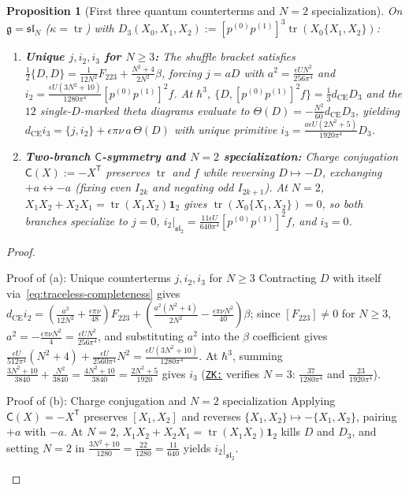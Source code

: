 \documentclass[11pt,letterpaper]{article}
\numberwithin{equation}{section}
\theoremstyle{plain}
\newtheorem{proposition}[theorem]{Proposition}
\theoremstyle{definition}
\theoremstyle{remark}
\newcommand{\fg}{\mathfrak{g}}
\newcommand{\fsl}{\mathfrak{sl}}
\newcommand{\tr}{\operatorname{tr}}
\newcommand{\zkcard}[1]{\href{http://127.0.0.1:9124/?stack=#1}{\texttt{ZK:\detokenize{#1}}}}
\begin{document}
\begin{proposition}[First three quantum counterterms and $N=2$ specialization]
\label{prop:i1-i2-i3}
On $\fg = \fsl_N$ ($\kappa = \tr$) with $D_3(X_0,X_1,X_2) := [p^{(0)}p^{(1)}]^3\tr(X_0\{X_1,X_2\})$:
\begin{enumerate}[label=(\alph*),leftmargin=*]
  \item \textbf{Unique $j, i_2, i_3$ for $N \ge 3$:} The shuffle bracket satisfies $\frac{1}{2}\{D, D\} = \frac{1}{12N^2}F_{223} + \frac{N^2+4}{2N^2}\beta$, forcing $j = a D$ with $a^2 = \frac{\epsilon U N^2}{256\pi^4}$ and $i_2 = \frac{\epsilon U(3N^2+10)}{1280\pi^4}[p^{(0)}p^{(1)}]^2 f$. At $\hbar^3$, $\{D, [p^{(0)}p^{(1)}]^2 f\} = \frac{1}{3}d_{\mathrm{CE}}D_3$ and the $12$ single-$D$-marked theta diagrams evaluate to $\Theta(D) = -\frac{N^2}{60}d_{\mathrm{CE}}D_3$, yielding $d_{\mathrm{CE}}i_3 = \{j,i_2\} + \epsilon\pi\nu\,a\,\Theta(D)$ with unique primitive $i_3 = \frac{a\epsilon U(2N^2+5)}{1920\pi^4}D_3$.
  \item \textbf{Two-branch $\mathsf{C}$-symmetry and $N = 2$ specialization:} Charge conjugation $\mathsf{C}(X) := -X^{\mathsf{T}}$ preserves $\tr$ and $f$ while reversing $D \mapsto -D$, exchanging $+a \leftrightarrow -a$ (fixing even $I_{2k}$ and negating odd $I_{2k+1}$). At $N = 2$, $X_1 X_2 + X_2 X_1 = \tr(X_1 X_2)\mathbf{1}_2$ gives $\tr(X_0\{X_1,X_2\}) = 0$, so both branches specialize to $j = 0$, $i_2|_{\fsl_2} = \frac{11\epsilon U}{640\pi^4}[p^{(0)}p^{(1)}]^2 f$, and $i_3 = 0$.
\end{enumerate}
\end{proposition}

\begin{proof}\leavevmode\par\vspace{2pt}
\begin{proofpart}{Proof of (a): Unique counterterms $j, i_2, i_3$ for $N \ge 3$}
Contracting $D$ with itself via~\eqref{eq:traceless-completeness} gives $d_{\mathrm{CE}}i_2 = (\frac{a^2}{12N^2} + \frac{\epsilon\pi\nu}{48})F_{223} + (\frac{a^2(N^2+4)}{2N^2} - \frac{\epsilon\pi\nu N^2}{40})\beta$; since $[F_{223}] \neq 0$ for $N \ge 3$, $a^2 = -\frac{\epsilon\pi\nu N^2}{4} = \frac{\epsilon U N^2}{256\pi^4}$, and substituting $a^2$ into the $\beta$ coefficient gives $\frac{\epsilon U}{512\pi^4}(N^2+4) + \frac{\epsilon U}{2560\pi^4}N^2 = \frac{\epsilon U(3N^2+10)}{1280\pi^4}$. At $\hbar^3$, summing $\frac{3N^2+10}{3840} + \frac{N^2}{3840} = \frac{4N^2+10}{3840} = \frac{2N^2+5}{1920}$ gives $i_3$ (\zkcard{fived-cs-sl3-counterterm-spotcheck} verifies $N=3$: $\frac{37}{1280\pi^4}$ and $\frac{23}{1920\pi^4}$).
\end{proofpart}
\begin{proofpart}{Proof of (b): Charge conjugation and $N = 2$ specialization}
Applying $\mathsf{C}(X) = -X^{\mathsf{T}}$ preserves $[X_1,X_2]$ and reverses $\{X_1,X_2\} \mapsto -\{X_1,X_2\}$, pairing $+a$ with $-a$. At $N = 2$, $X_1 X_2 + X_2 X_1 = \tr(X_1 X_2)\mathbf{1}_2$ kills $D$ and $D_3$, and setting $N = 2$ in $\frac{3N^2+10}{1280} = \frac{22}{1280} = \frac{11}{640}$ yields $i_2|_{\fsl_2}$.\qedhere
\end{proofpart}
\end{proof}
\end{document}
